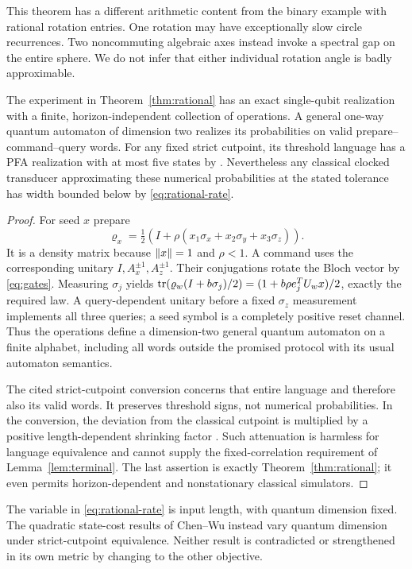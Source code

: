 This theorem has a different arithmetic content from the binary example
with rational rotation entries. One rotation may have exceptionally slow
circle recurrences. Two noncommuting algebraic axes instead invoke a
spectral gap on the entire sphere. We do not infer that either individual
rotation angle is badly approximable.

\begin{proposition}
\label{prop:qubit}
The experiment in Theorem~\ref{thm:rational} has an exact single-qubit
realization with a finite, horizon-independent collection of operations.
A general one-way quantum automaton of dimension two realizes its
probabilities on valid prepare--command--query words. For any fixed
strict cutpoint, its threshold language has a PFA realization with at
most five states by \cite[Theorem~3.2]{CW26a}. Nevertheless any classical
clocked transducer approximating these numerical probabilities at the
stated tolerance has width bounded below by \eqref{eq:rational-rate}.
\end{proposition}
\begin{proof}
For seed $x$ prepare
\[
 \varrho_x=\tfrac12(I+\rho(x_1\sigma_x+x_2\sigma_y+x_3\sigma_z)).
\]
It is a density matrix because $\lVert x\rVert=1$ and $\rho<1$.
A command uses the corresponding unitary $I,A_x^{\pm1},A_z^{\pm1}$.
Their conjugations rotate the Bloch vector by \eqref{eq:gates}.
Measuring $\sigma_j$ yields
$\operatorname{tr}(\varrho_w(I+b\sigma_j)/2)
 =(1+b\rho e_j^TU_wx)/2$, exactly the required law.
A query-dependent unitary before a fixed $\sigma_z$ measurement implements
all three queries; a seed symbol is a completely positive reset channel.
Thus the operations define a dimension-two general quantum automaton on
a finite alphabet, including all words outside the promised protocol
with its usual automaton semantics.

The cited strict-cutpoint conversion concerns that entire language and
therefore also its valid words. It preserves threshold signs, not
numerical probabilities. In the conversion, the deviation from the
classical cutpoint is multiplied by a positive length-dependent shrinking
factor \cite[Proposition~3.1]{CW26a}. Such attenuation is harmless for
language equivalence and cannot supply the fixed-correlation requirement
of Lemma~\ref{lem:terminal}. The last assertion is exactly
Theorem~\ref{thm:rational}; it even permits horizon-dependent and
nonstationary classical simulators.
\end{proof}

The variable in \eqref{eq:rational-rate} is input length, with quantum
dimension fixed. The quadratic state-cost results of Chen--Wu
\cite{CW26a,CW26b} instead vary quantum dimension under strict-cutpoint
equivalence. Neither result is contradicted or strengthened in its own
metric by changing to the other objective.
